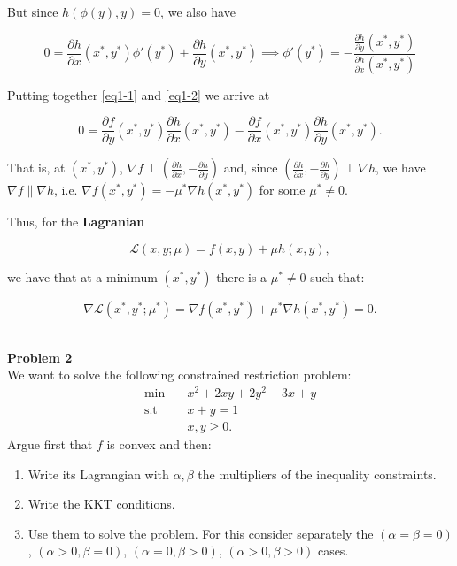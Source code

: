 \documentclass[11pt,table]{article}
\newenvironment{problem}[2][Problem]
{ \begin{mdframed}[backgroundcolor=gray!20] \textbf{#1 #2} \\ }
	{  \end{mdframed} }
\begin{document}
	But since $h(\phi(y), y) = 0$, we also have
	
	\begin{equation}
		\label{eq1-2}
		0 = \frac{\partial h}{\partial x}(x^*, y^*)\phi'(y^*) + \frac{\partial h}{\partial y}(x^*, y^*) \implies \phi'(y^*) = -\frac{\frac{\partial h}{\partial y}(x^*, y^*)}{\frac{\partial h}{\partial x}(x^*, y^*)} 
	\end{equation}
	
	Putting together \ref{eq1-1} and \ref{eq1-2} we arrive at
	
	\[
	0 = \frac{\partial f}{\partial y}(x^*, y^*) \frac{\partial h}{\partial x}(x^*, y^*) - 
	\frac{\partial f}{\partial x}(x^*, y^*) \frac{\partial h}{\partial y}(x^*, y^*).
	\]
	
	That is, at $(x^*, y^*)$, $\nabla f \perp \left( \frac{\partial h}{\partial x}, -\frac{\partial h}{\partial y} \right)$ and, since $\left( \frac{\partial h}{\partial x}, -\frac{\partial h}{\partial y} \right) \perp \nabla h$, we have $\nabla f \parallel \nabla h$, i.e. $\nabla f(x^*, y^*) = - \mu^* \nabla h(x^*, y^*)$ for some $\mu^* \neq 0$.
	
	Thus, for the \textbf{Lagranian}
	
	\[
	\mathcal L(x, y; \mu) = f(x,y) + \mu h(x,y),
	\]
	
	we have that at a minimum $(x^*, y^*)$ there is a $\mu^* \neq 0$ such that:
	
	\[
	\nabla \mathcal L(x^*, y^*; \mu^*) = \nabla f(x^*, y^*) + \mu^* \nabla h(x^*, y^*) = 0.
	\] \\
	
	\begin{problem}{2}
		We want to solve the following constrained restriction problem:
		\begin{align*}
			\min \quad       & x^{2} + 2xy + 2y^2 - 3x + y \\
			\text{s.t} \quad & x + y = 1            \\
			& x,y \geq 0.
		\end{align*}
		Argue first that \(f\) is convex and then:
		\begin{enumerate}
			\item Write its Lagrangian with \(\alpha,\beta\) the multipliers of the inequality constraints.
			\item Write the KKT conditions.
			\item Use them to solve the problem. For this consider separately the \((\alpha = \beta = 0)\), \((\alpha > 0, \beta = 0)\), \((\alpha = 0, \beta > 0)\), \((\alpha > 0, \beta > 0)\) cases.
		\end{enumerate}
	\end{problem}
	
\end{document}

